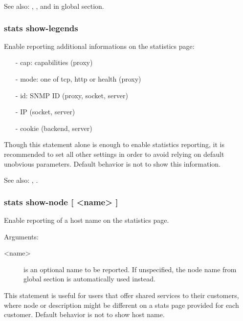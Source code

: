   See also: , ,  and  in
            global section.

\subsubsection{stats show-legends}



  Enable reporting additional informations on the statistics page:
  \begin{itemize}
  \item[-] cap: capabilities (proxy)
  \item[-] mode: one of tcp, http or health (proxy)
  \item[-] id: SNMP ID (proxy, socket, server)
  \item[-] IP (socket, server)
  \item[-] cookie (backend, server)
  \end{itemize}

  Though this statement alone is enough to enable statistics reporting, it is
  recommended to set all other settings in order to avoid relying on default
  unobvious parameters.  Default behavior is not to show this information.

  See also: , .


\subsubsection[stats show-node]{stats show-node [ <name> ]}


  Enable reporting of a host name on the statistics page.


  Arguments:
  \begin{description}
  \item[<name>] is an optional name to be reported. If unspecified, the
              node name from global section is automatically used instead.
  \end{description}

  This statement is useful for users that offer shared services to their
  customers, where node or description might be different on a stats page
  provided for each customer.  Default behavior is not to show host name.

